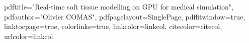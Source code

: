 \graphicspath{{.}{images/}}

\usepackage{color}


\hypersetup
{
pdftitle="Real-time soft tissue modelling on GPU for medical simulation", %
pdfauthor="Olivier COMAS", %
pdfpagelayout=SinglePage, %
pdffitwindow=true, %
linktocpage=true, %
colorlinks=true, %
linkcolor=linkcol, %
citecolor=citecol, %
urlcolor=linkcol %
}

\usepackage[all]{hypcap}

\usepackage[notlot,notlof]{tocbibind}
\usepackage{tocvsec2}


\setcounter{secnumdepth}{3}				%
\setcounter{tocdepth}{2} 					%

\newcommand{\pd}[2]{\dfrac{\partial #1}{\partial #2}}

\newcommand{\fig}[1]{Fig.~\ref{#1}}

